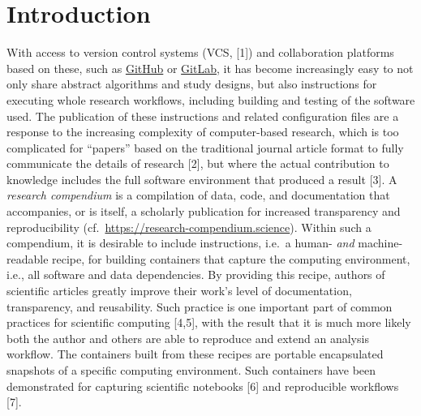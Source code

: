 \documentclass[10pt,letterpaper]{article}
\begin{document}

\linenumbers

\hypertarget{introduction}{%
\section*{Introduction}\label{introduction}}

With access to version control systems (VCS, {[}1{]}) and collaboration
platforms based on these, such as \href{https://github.com}{GitHub} or
\href{https://gitlab.com}{GitLab}, it has become increasingly easy to
not only share abstract algorithms and study designs, but also
instructions for executing whole research workflows, including building
and testing of the software used. The publication of these instructions
and related configuration files are a response to the increasing
complexity of computer-based research, which is too complicated for
``papers'' based on the traditional journal article format to fully
communicate the details of research {[}2{]}, but where the actual
contribution to knowledge includes the full software environment that
produced a result {[}3{]}. A \emph{research compendium} is a compilation
of data, code, and documentation that accompanies, or is itself, a
scholarly publication for increased transparency and reproducibility
(cf.~\url{https://research-compendium.science}). Within such a
compendium, it is desirable to include instructions, i.e.~a human-
\emph{and} machine-readable recipe, for building containers that capture
the computing environment, i.e., all software and data dependencies. By
providing this recipe, authors of scientific articles greatly improve
their work's level of documentation, transparency, and reusability. Such
practice is one important part of common practices for scientific
computing {[}4,5{]}, with the result that it is much more likely both
the author and others are able to reproduce and extend an analysis
workflow. The containers built from these recipes are portable
encapsulated snapshots of a specific computing environment. Such
containers have been demonstrated for capturing scientific notebooks
{[}6{]} and reproducible workflows {[}7{]}.
\end{document}
